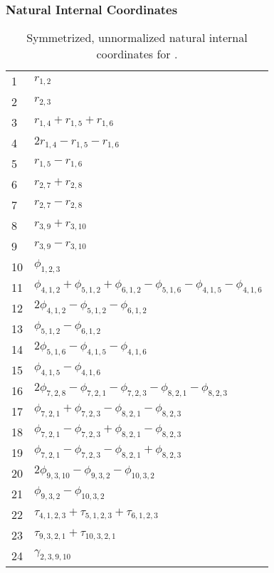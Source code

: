 \documentclass[10pt,oneside]{article}
\begin{document}
\subsubsection*{Natural Internal Coordinates}
\begin{table}[h!]
\centering
\caption{Symmetrized, unnormalized natural internal coordinates for .}
\small
\begin{tabular}{ll}
  1   & $r_{1,2}$ \\
  2   & $r_{2,3}$ \\
  3   & $r_{1,4} + r_{1,5} + r_{1,6}$ \\
  4   & $2r_{1,4} - r_{1,5} - r_{1,6}$ \\
  5   & $r_{1,5} - r_{1,6}$ \\
  6   & $r_{2,7} + r_{2,8}$ \\
  7   & $r_{2,7} - r_{2,8}$ \\
  8   & $r_{3,9} + r_{3,10}$ \\
  9   & $r_{3,9} - r_{3,10}$ \\
  10  & $\phi_{1,2,3}$ \\
  11  & $\phi_{4,1,2} + \phi_{5,1,2} + \phi_{6,1,2} - \phi_{5,1,6} - \phi_{4,1,5} - \phi_{4,1,6}$ \\
  12  & $2\phi_{4,1,2} - \phi_{5,1,2} - \phi_{6,1,2}$ \\
  13  & $\phi_{5,1,2} - \phi_{6,1,2}$ \\
  14  & $2\phi_{5,1,6} - \phi_{4,1,5} - \phi_{4,1,6}$ \\
  15  & $\phi_{4,1,5} - \phi_{4,1,6}$ \\
  16  & $2\phi_{7,2,8} - \phi_{7,2,1} - \phi_{7,2,3} - \phi_{8,2,1} - \phi_{8,2,3}$ \\
  17  & $\phi_{7,2,1} + \phi_{7,2,3} - \phi_{8,2,1} - \phi_{8,2,3}$ \\
  18  & $\phi_{7,2,1} - \phi_{7,2,3} + \phi_{8,2,1} - \phi_{8,2,3}$ \\
  19  & $\phi_{7,2,1} - \phi_{7,2,3} - \phi_{8,2,1} + \phi_{8,2,3}$ \\
  20  & $2\phi_{9,3,10} - \phi_{9,3,2} - \phi_{10,3,2}$ \\
  21  & $\phi_{9,3,2} - \phi_{10,3,2}$ \\
  22  & $\tau_{4,1,2,3} + \tau_{5,1,2,3} + \tau_{6,1,2,3}$ \\
  23  & $\tau_{9,3,2,1} + \tau_{10,3,2,1}$ \\
  24  & $\gamma_{2,3,9,10}$ \\
\end{tabular}
\end{table}
\end{document}
